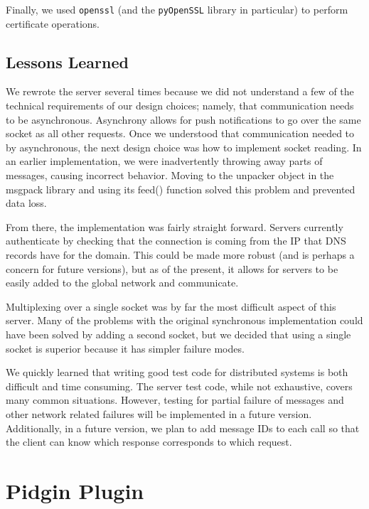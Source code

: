 \documentclass{sig-alternate}
\begin{document}
Finally, we used \texttt{openssl} (and the \texttt{pyOpenSSL} library in
particular) to perform certificate operations.

\subsection{Lessons Learned}

We rewrote the server several times because we did not understand a few of the technical requirements of our design choices; namely, that communication needs to be asynchronous. Asynchrony allows for  push notifications to go over the same socket as all other requests. Once we understood that communication needed to by asynchronous, the next  design choice was how to implement socket reading. In an earlier implementation, we were inadvertently throwing away parts of messages, causing incorrect behavior. Moving to the unpacker object in the msgpack library and using its feed() function solved this problem and prevented data loss.

From there, the implementation was fairly straight forward. Servers currently authenticate by checking that the connection is coming from the IP that DNS records have for the domain. This could be made more robust (and is perhaps a concern for future versions), but as of the present, it allows for servers to be easily added to the global network and communicate.

Multiplexing over a single socket was by far the most difficult aspect of this server. Many of the problems with the original synchronous implementation could have been solved by adding a second socket, but we decided that using a single socket is superior because it has simpler failure modes.

We quickly learned that writing good test code for distributed systems is both difficult and time consuming. The server test code, while not exhaustive, covers many common situations. However, testing for partial failure of messages and other network related failures will be implemented in a future version.   Additionally, in a future version, we plan to add message IDs to each call so that the client can know which response corresponds to which request.


\section{Pidgin Plugin}
\end{document}
